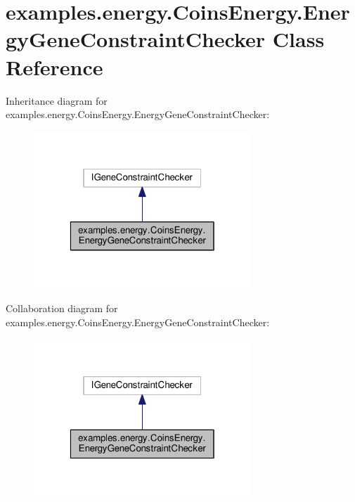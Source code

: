 \hypertarget{classexamples_1_1energy_1_1_coins_energy_1_1_energy_gene_constraint_checker}{\section{examples.\-energy.\-Coins\-Energy.\-Energy\-Gene\-Constraint\-Checker Class Reference}
\label{classexamples_1_1energy_1_1_coins_energy_1_1_energy_gene_constraint_checker}
}


Inheritance diagram for examples.\-energy.\-Coins\-Energy.\-Energy\-Gene\-Constraint\-Checker\-:
\nopagebreak
\begin{figure}[H]
\begin{center}
\leavevmode
\includegraphics[width=232pt]{classexamples_1_1energy_1_1_coins_energy_1_1_energy_gene_constraint_checker__inherit__graph}
\end{center}
\end{figure}


Collaboration diagram for examples.\-energy.\-Coins\-Energy.\-Energy\-Gene\-Constraint\-Checker\-:
\nopagebreak
\begin{figure}[H]
\begin{center}
\leavevmode
\includegraphics[width=232pt]{classexamples_1_1energy_1_1_coins_energy_1_1_energy_gene_constraint_checker__coll__graph}
\end{center}
\end{figure}
